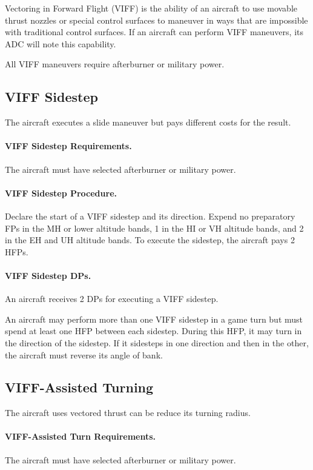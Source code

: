 \begin{advancedrules}
{}{

Vectoring in Forward Flight (VIFF) is the ability of an aircraft to use movable thrust nozzles or special control surfaces to maneuver in ways that are impossible with traditional control surfaces. If an aircraft can perform VIFF maneuvers, its ADC will note this capability.

All VIFF maneuvers require afterburner or military power.

\subsection{VIFF Sidestep}

The aircraft executes a slide maneuver but pays different costs for the result.

\paragraph{VIFF Sidestep Requirements.} The aircraft must have selected afterburner or military power.

\paragraph{VIFF Sidestep Procedure.} Declare the start of a VIFF sidestep and its direction. Expend no preparatory FPs in the MH or lower altitude bands, 1 in the HI or VH altitude bands, and 2 in the EH and UH altitude bands. To execute the sidestep, the aircraft pays 2 HFPs.

\paragraph{VIFF Sidestep DPs.} An aircraft receives 2 DPs for executing a VIFF sidestep.

An aircraft may perform more than one VIFF sidestep in a game turn but must spend at least one HFP between each sidestep. During this HFP, it may turn in the direction of the sidestep. If it sidesteps in one direction and then in the other, the aircraft must reverse its angle of bank.

\subsection{VIFF-Assisted Turning}

The aircraft uses vectored thrust can be reduce its turning radius. 

\paragraph{VIFF-Assisted Turn Requirements.} The aircraft must have selected afterburner or military power.

}
\end{advancedrules}
